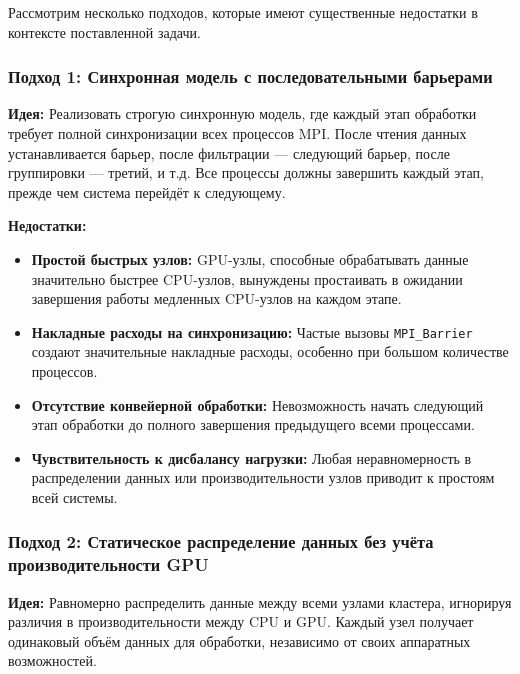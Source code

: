 \documentclass[areaset=advanced]{scrartcl}
\begin{document}
Рассмотрим несколько подходов, которые имеют существенные недостатки в контексте поставленной задачи.

\subsubsection{Подход 1: Синхронная модель с последовательными барьерами}

\textbf{Идея:} Реализовать строгую синхронную модель, где каждый этап обработки требует полной синхронизации всех процессов MPI. После чтения данных устанавливается барьер, после фильтрации — следующий барьер, после группировки — третий, и т.д. Все процессы должны завершить каждый этап, прежде чем система перейдёт к следующему.

\textbf{Недостатки:}
\begin{itemize}
    \item \textbf{Простой быстрых узлов:} GPU-узлы, способные обрабатывать данные значительно быстрее CPU-узлов, вынуждены простаивать в ожидании завершения работы медленных CPU-узлов на каждом этапе.
    \item \textbf{Накладные расходы на синхронизацию:} Частые вызовы \texttt{MPI\_Barrier} создают значительные накладные расходы, особенно при большом количестве процессов.
    \item \textbf{Отсутствие конвейерной обработки:} Невозможность начать следующий этап обработки до полного завершения предыдущего всеми процессами.
    \item \textbf{Чувствительность к дисбалансу нагрузки:} Любая неравномерность в распределении данных или производительности узлов приводит к простоям всей системы.
\end{itemize}

\subsubsection{Подход 2: Статическое распределение данных без учёта производительности GPU}

\textbf{Идея:} Равномерно распределить данные между всеми узлами кластера, игнорируя различия в производительности между CPU и GPU. Каждый узел получает одинаковый объём данных для обработки, независимо от своих аппаратных возможностей.
\end{document}
